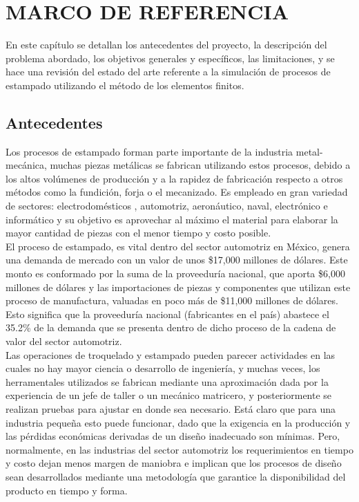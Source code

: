 \chapter{MARCO DE REFERENCIA}\label{ch:marco_de_referencia}

En este capítulo se detallan los antecedentes del proyecto, la descripción 
del problema abordado, los objetivos generales y específicos, las limitaciones, y se hace una 
revisión del estado del arte referente a la simulación de procesos de estampado utilizando 
el método de los elementos finitos.

\section{Antecedentes}

Los procesos de estampado forman  parte importante de la industria metal-mecánica, muchas 
piezas metálicas se fabrican utilizando estos procesos, debido a los altos volúmenes de 
producción y a la rapidez de fabricación respecto a otros métodos como la fundición, forja 
o el mecanizado. Es empleado en gran variedad de sectores: electrodomésticos ,
automotriz, aeronáutico, naval, electrónico e informático y su objetivo es aprovechar al máximo 
el material para elaborar la mayor cantidad de piezas con el menor tiempo y costo posible. \\

El proceso de estampado, es vital dentro del sector automotriz en México, genera una demanda 
de mercado con un valor de unos \$17,000 millones de dólares. Este monto es conformado por la 
suma de la proveeduría nacional, que aporta \$6,000 millones de dólares y las importaciones de 
piezas y componentes que utilizan este proceso de manufactura, valuadas en poco más de 
\$11,000 millones de dólares. Esto significa que la proveeduría nacional (fabricantes en el país) 
abastece el 35.2\% de la demanda que se presenta dentro de dicho proceso de la cadena de valor 
del sector automotriz. ~\cite{elhorizonte} \\

Las operaciones de troquelado y estampado pueden parecer actividades en las cuales no hay mayor 
ciencia o desarrollo de ingeniería, y muchas veces, los herramentales utilizados 
se fabrican mediante una aproximación dada por la experiencia de un jefe de taller o un 
mecánico matricero, y posteriormente se realizan pruebas para ajustar en donde sea necesario.
Está claro que para una industria pequeña esto puede funcionar, dado que la exigencia 
en la producción y las pérdidas económicas derivadas de un diseño inadecuado son mínimas. 
Pero, normalmente, en las industrias del sector automotriz los requerimientos en tiempo y 
costo dejan menos margen de maniobra e implican que los procesos de diseño sean desarrollados 
mediante una metodología que garantice la disponibilidad del producto en tiempo y forma.\\

